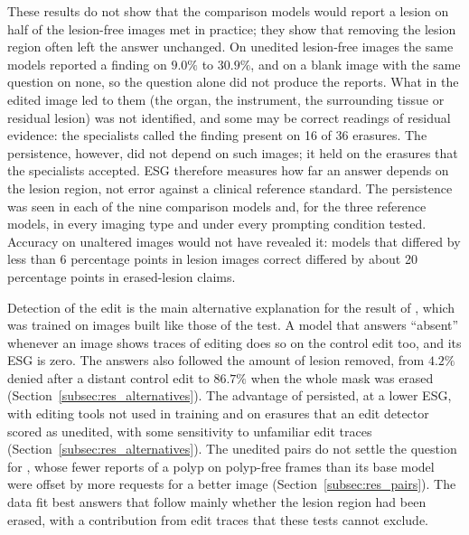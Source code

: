 These results do not show that the comparison models would report a lesion on half of the lesion-free images met in practice; they show that removing the lesion region often left the answer unchanged. On unedited lesion-free images the same models reported a finding on $9.0\%$ to $30.9\%$, and on a blank image with the same question on none, so the question alone did not produce the reports. What in the edited image led to them (the organ, the instrument, the surrounding tissue or residual lesion) was not identified, and some may be correct readings of residual evidence: the specialists called the finding present on 16 of 36 erasures. The persistence, however, did not depend on such images; it held on the erasures that the specialists accepted. ESG therefore measures how far an answer depends on the lesion region, not error against a clinical reference standard. The persistence was seen in each of the nine comparison models and, for the three reference models, in every imaging type and under every prompting condition tested. Accuracy on unaltered images would not have revealed it: models that differed by less than 6 percentage points in lesion images correct differed by about 20 percentage points in erased-lesion claims.

Detection of the edit is the main alternative explanation for the result of \ms, which was trained on images built like those of the test. A model that answers ``absent'' whenever an image shows traces of editing does so on the control edit too, and its ESG is zero. The answers also followed the amount of lesion removed, from $4.2\%$ denied after a distant control edit to $86.7\%$ when the whole mask was erased (Section~\ref{subsec:res_alternatives}). The advantage of \ms{} persisted, at a lower ESG, with editing tools not used in training and on erasures that an edit detector scored as unedited, with some sensitivity to unfamiliar edit traces (Section~\ref{subsec:res_alternatives}). The unedited pairs do not settle the question for \ms, whose fewer reports of a polyp on polyp-free frames than its base model were offset by more requests for a better image (Section~\ref{subsec:res_pairs}). The data fit best answers that follow mainly whether the lesion region had been erased, with a contribution from edit traces that these tests cannot exclude.

